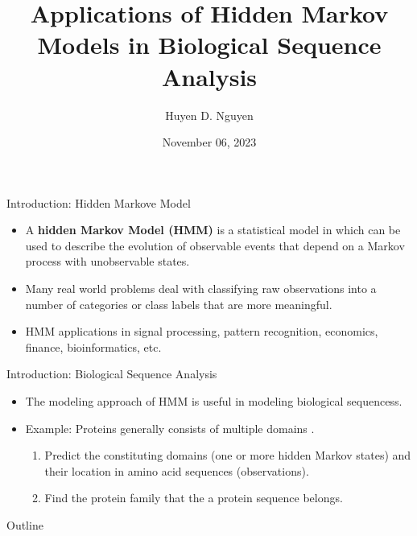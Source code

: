 \documentclass{beamer}
\title[University of Connecticut] {Applications of Hidden Markov Models in Biological Sequence Analysis}
\author{Huyen D. Nguyen}
\institute[]{University of Connecticut \\
	\medskip
	\text{Department of Statistics}\\
}
\date{November 06, 2023}
\begin{document}
\begin{frame}
	\titlepage
\end{frame}

\begin{frame}{Introduction: Hidden Markove Model}
	\begin{itemize}
		\item A \textbf{hidden Markov Model (HMM)} is a statistical model in which can be used to describe the evolution of observable events that depend on a Markov process with unobservable states. 
		\item Many real world problems deal with classifying raw observations into a number of categories or class labels that are more meaningful.
		\item HMM applications in signal processing, pattern recognition, economics, finance, bioinformatics, etc.
	\end{itemize}
\end{frame}

\begin{frame}{Introduction: Biological Sequence Analysis}
	\begin{itemize}
		\item The modeling approach of HMM is useful in modeling biological sequencess.
		\item Example: Proteins generally consists of multiple domains \cite{yoon2009hidden}. 
		\begin{enumerate}
			\item Predict the constituting domains (one or more hidden Markov states) and their location in amino acid sequences (observations).
			\item Find the protein family that the a protein sequence belongs.
		\end{enumerate}
	\end{itemize}
\end{frame}

\begin{frame}{Outline}
	\tableofcontents
\end{frame}
\end{document}
